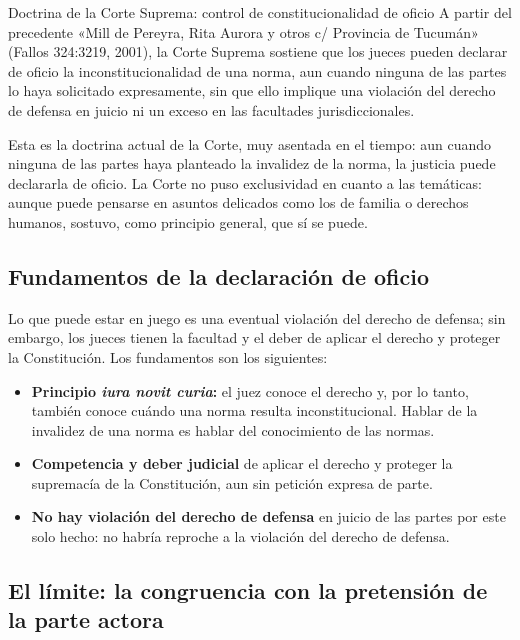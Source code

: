 \documentclass[12pt,oneside]{book}
\begin{document}
\begin{norma}{Doctrina de la Corte Suprema: control de constitucionalidad de oficio}
A partir del precedente «Mill de Pereyra, Rita Aurora y otros c/ Provincia de Tucumán» (Fallos 324:3219, 2001), la Corte Suprema sostiene que los jueces pueden declarar de oficio la inconstitucionalidad de una norma, aun cuando ninguna de las partes lo haya solicitado expresamente, sin que ello implique una violación del derecho de defensa en juicio ni un exceso en las facultades jurisdiccionales.
\end{norma}

Esta es la doctrina actual de la Corte, muy asentada en el tiempo: aun cuando ninguna de las partes haya planteado la invalidez de la norma, la justicia puede declararla de oficio. La Corte no puso exclusividad en cuanto a las temáticas: aunque puede pensarse en asuntos delicados como los de familia o derechos humanos, sostuvo, como principio general, que sí se puede.

\subsection{Fundamentos de la declaración de oficio}

Lo que puede estar en juego es una eventual violación del derecho de defensa; sin embargo, los jueces tienen la facultad y el deber de aplicar el derecho y proteger la Constitución. Los fundamentos son los siguientes:

\begin{itemize}
    \item \textbf{Principio \textit{iura novit curia}:} el juez conoce el derecho y, por lo tanto, también conoce cuándo una norma resulta inconstitucional. Hablar de la invalidez de una norma es hablar del conocimiento de las normas.
    \item \textbf{Competencia y deber judicial} de aplicar el derecho y proteger la supremacía de la Constitución, aun sin petición expresa de parte.
    \item \textbf{No hay violación del derecho de defensa} en juicio de las partes por este solo hecho: no habría reproche a la violación del derecho de defensa.
\end{itemize}

\subsection{El límite: la congruencia con la pretensión de la parte actora}
\end{document}
